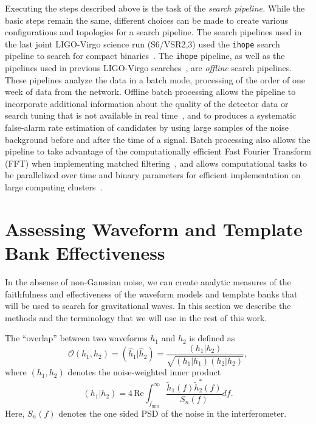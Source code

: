 Executing the steps described above is the task of the \emph{search pipeline.}
While the basic steps remain the same, different choices can be made to
create various configurations and topologies for a search pipeline. The search
pipelines used in the last joint LIGO-Virgo science run (S6/VSR2,3) used the
\texttt{ihope} search pipeline to search for compact
binaries~\cite{Babak:2012zx}. The \texttt{ihope} pipeline, as well as the
pipelines used in previous LIGO-Virgo
searches~\cite{Brown:2004pv,Brown:2005zs}, are \emph{offline} search
pipelines. These pipelines analyze the data in a batch mode, processing
of the order of one week of data from the network. Offline batch
processing allows the pipeline to incorporate additional information about the
quality of the detector data or search tuning that is not available in real
time~\cite{Aasi:2012wd,Aasi:2014mqd}, and to produces a systematic false-alarm rate
estimation of candidates by using large samples of the noise background before
and after the time of a signal. Batch processing also allows the pipeline to
take advantage of the computationally efficient Fast Fourier Transform (FFT)
when implementing matched filtering~\cite{Allen:2005fk}, and allows
computational tasks to be parallelized over time and binary parameters for
efficient implementation on large computing clusters~\cite{Brown:workflow}.

\section{Assessing Waveform and Template Bank Effectiveness}
\label{sec:analytic_vol}

In the absense of non-Gaussian noise, we can create analytic measures of the
faithfulness and effectiveness of the waveform models and template banks that 
will be used to search for gravitational waves. In this section we describe 
the methods and the terminology that we will use in the rest of this work.

The ``overlap'' between two waveforms $h_1$ and $h_2$ is defined as
%
\begin{equation}
 \mathcal{O}(h_1,h_2) = (\hat{h}_1|\hat{h}_2) =
\dfrac{(h_1|h_2)}{\sqrt{(h_1|h_1)(h_2|h_2)}},
\end{equation}
%
where $(h_1,h_2)$ denotes the noise-weighted inner product
%
\begin{equation}
(h_1|h_2) = 4 \, \mathrm{Re}
\int^{\infty}_{f_{\mathrm{min}}}\dfrac{\tilde{h}_1(f)\tilde{h}_2^*(f)}{S_n(f)} 
df.
\end{equation}
%
Here, $S_n(f)$ denotes the one sided \ac{PSD} of the noise in the
interferometer.

